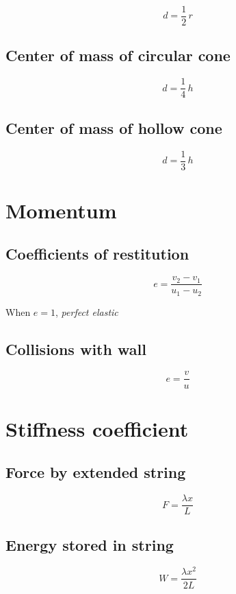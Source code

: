 \documentclass[a4paper,9pt]{scrartcl}
\begin{document}
    \begin{displaymath}
        d = \frac{1}{2}\,r
    \end{displaymath}

    \subsection{Center of mass of circular cone}

    \begin{displaymath}
        d = \frac{1}{4}\,h
    \end{displaymath}

    \subsection{Center of mass of hollow cone}

    \begin{displaymath}
        d = \frac{1}{3}\,h
    \end{displaymath}


    \section{Momentum}

    \subsection{Coefficients of restitution}

    \begin{displaymath}
        e = \frac{v_2-v_1}{u_1-u_2}
    \end{displaymath}

    When $e=1$, \textit{perfect elastic}

    \subsection{Collisions with wall}

    \begin{displaymath}
        e = \frac{v}{u}
    \end{displaymath}


    \section{Stiffness coefficient}

    \subsection{Force by extended string}
    \begin{displaymath}
        F = \frac{{\lambda}x}{L}
    \end{displaymath}

    \subsection{Energy stored in string}
    \begin{displaymath}
        W = \frac{{\lambda}x^2}{2L}
    \end{displaymath}
\end{document}
